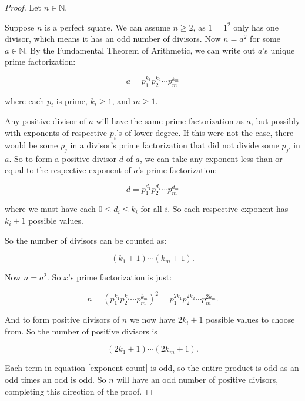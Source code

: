 \documentclass{article}
\theoremstyle{definition}
\begin{document}
\begin{proof}
Let $n \in \mathbb{N}$. 

Suppose $n$ is a perfect square. We can assume $n \geq 2$, as $1 = 1^2$ only has one divisor, which means it has an odd number of divisors. Now $n = a^2$ for some $a \in \mathbb{N}$. By the Fundamental Theorem of Arithmetic, we can write out $a$'s unique prime factorization:

\begin{equation*}
a = p_1^{k_1} p_2^{k_2} \cdots p_m^{k_m}
\end{equation*}

where each $p_i$ is prime, $k_i \geq 1$, and $m \geq 1$.

Any positive divisor of $a$ will have the same prime factorization as $a$, but possibly with exponents of respective $p_i$'s of lower degree. If this were not the case, there would be some $p_j$ in a divisor's prime factorization that did not divide some $p_{j'}$ in $a$. So to form a positive divisor $d$ of $a$, we can take any exponent less than or equal to the respective exponent of $a$'s prime factorization:

\begin{equation*}
d = p_1^{d_1} p_2^{d_2} \cdots p_m^{d_m}
\end{equation*}

where we must have each $0 \leq d_i \leq k_i$ for all $i$. So each respective exponent has $k_i + 1$ possible values.

So the number of divisors can be counted as:

\begin{equation*}
(k_1 + 1) \cdots (k_m + 1).
\end{equation*}

Now $n = a^2$. So $x$'s prime factorization is just:

\begin{equation*}
n = \left(p_1^{k_1} p_2^{k_2} \cdots p_m^{k_m}\right)^2 = p_1^{2k_1} p_2^{2k_2} \cdots p_m^{2k_m}.
\end{equation*}

And to form positive divisors of $n$ we now have $2k_i + 1$ possible values to choose from. So the number of positive divisors is

\begin{equation} \label{exponent-count}
(2k_1 + 1) \cdots (2k_m + 1).
\end{equation}

Each term in equation \ref{exponent-count} is odd, so the entire product is odd as an odd times an odd is odd. So $n$ will have an odd number of positive divisors, completing this direction of the proof.


\end{proof}
\end{document}
